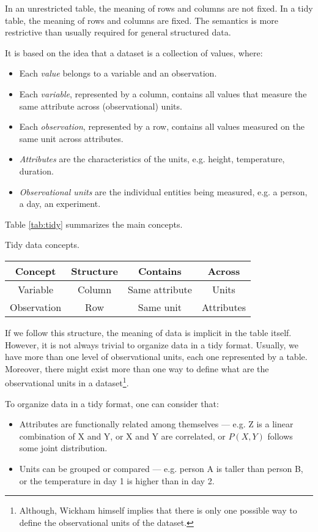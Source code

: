 In an unrestricted table, the meaning of rows and columns are not fixed.  In a tidy table,
the meaning of rows and columns are fixed.  The semantics is more restrictive than usually
required for general structured data.

It is based on the idea that a dataset is a collection of values, where:
\begin{itemize}
  \item Each \emph{value} belongs to a variable and an observation.
  \item Each \emph{variable}, represented by a column, contains all values that measure
    the same attribute across (observational) units.
  \item Each \emph{observation}, represented by a row, contains all values measured on the
    same unit across attributes.
  \item \emph{Attributes} are the characteristics of the units, e.g. height, temperature,
    duration.
  \item \emph{Observational units} are the individual entities being measured, e.g. a
    person, a day, an experiment.
\end{itemize}
Table \ref{tab:tidy} summarizes the main concepts.

\begin{tablebox}[label=tab:tidy]{Tidy data concepts.}
  \centering
  \begin{tabular}{cccc}
    \toprule
    \textbf{Concept} & \textbf{Structure} & \textbf{Contains} & \textbf{Across} \\
    \midrule
    Variable & Column & Same attribute & Units \\
    Observation & Row & Same unit & Attributes \\
    \bottomrule
  \end{tabular}
\end{tablebox}

If we follow this structure, the meaning of data is implicit in the table itself.
However, it is not always trivial to organize data in a tidy format.  Usually, we have
more than one level of observational units, each one represented by a table.  Moreover,
there might exist more than one way to define what are the observational units in a
dataset\footnote{Although, Wickham himself implies that there is only one possible way to
define the observational units of the dataset.}.

To organize data in a tidy format, one can consider that:
\begin{itemize}
  \item Attributes are functionally related among themselves --- e.g. Z is a linear
    combination of X and Y, or X and Y are correlated, or $P(X, Y)$ follows some joint distribution.
  \item Units can be grouped or compared --- e.g. person A is taller than person B, or
    the temperature in day 1 is higher than in day 2.
\end{itemize}

